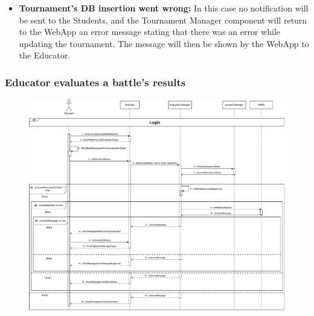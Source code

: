 \documentclass{article}
\begin{document}
{\begin{itemize}
            Tournament Manager component just return an error message to the WebApp stating 
            that the closure of the tournament has been denied since there is still at least
            one battle active within it. The message will then be shown to the Educator by the 
            WebApp.
            \item \textbf{Tournament's DB insertion went wrong:} In this case no 
            notification will be sent to the Students, and the Tournament Manager component will 
            return to the WebApp an error message stating that there was an error while 
            updating the tournament.
            The message will then be shown by the WebApp to the Educator.
        \end{itemize}


    \subsubsection{Educator evaluates a battle's results}
        \begin{figure}[H]
            \centering
            \hspace*{-3.1cm}\includegraphics[scale=0.55]{Sequence/Sequence8DD.pdf}
            \caption{}
            \label{fig:Sequence8DD}
        \end{figure}
        
}
\end{document}
